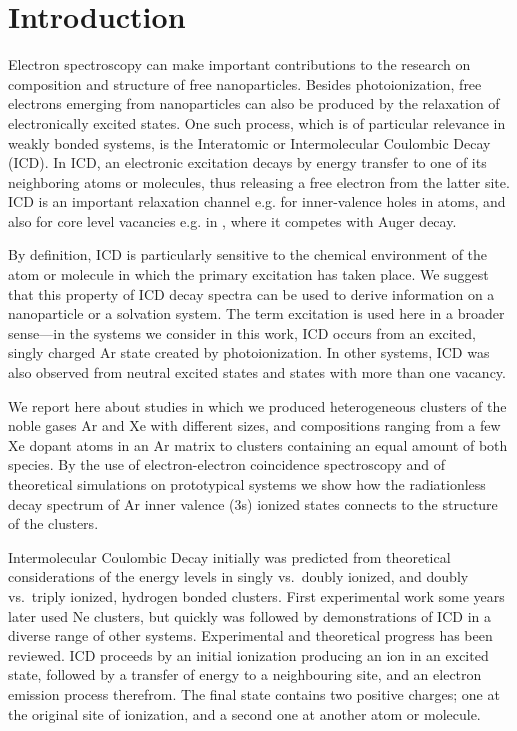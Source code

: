 \section{Introduction}
%
Electron spectroscopy can make important contributions to the 
research on composition and structure of free nanoparticles.\cite{
jpcc} Besides photoionization, free electrons emerging from 
nanoparticles can also be produced by the relaxation of 
electronically excited states. One such process, which is of 
particular relevance in weakly bonded systems, is the 
Interatomic or Intermolecular Coulombic Decay (ICD).\cite{
cederbaum} In ICD, an electronic excitation decays by energy 
transfer to one of its neighboring atoms or molecules, thus 
releasing a free electron from the latter site. ICD is an 
important relaxation channel e.g. for inner-valence holes in 
atoms, and also for core level vacancies e.g. in 
, where it competes with Auger decay.\cite{slavicek}

By definition, ICD is particularly sensitive to the chemical 
environment of the atom or molecule in which the primary 
excitation has taken place. We suggest that this property of ICD 
decay spectra can be used to derive information on a nanoparticle 
or a solvation system. 
The term excitation is used here in a broader sense---in the
systems we consider in this work, ICD occurs from an excited, singly 
charged Ar state created by photoionization.
In other systems, ICD was also observed from neutral excited
states and states with more than one vacancy.

We report here about studies 
in which we produced heterogeneous clusters of the noble gases Ar 
and Xe with different sizes, and compositions ranging from a few 
Xe dopant atoms in an Ar matrix to clusters containing an equal 
amount of both species. By the use of electron-electron 
coincidence spectroscopy and of theoretical simulations on 
prototypical systems we show how the radiationless decay spectrum 
of Ar inner valence (3s) ionized states connects to the structure 
of the clusters.

Intermolecular Coulombic Decay initially was predicted from 
theoretical considerations of the energy levels in singly vs.\  
doubly ionized, and doubly vs.\ triply ionized, hydrogen bonded 
clusters.\cite{cederbaum} First experimental work some years 
later used Ne clusters,\cite{marburger,jahnkenedimer} but quickly 
was followed by demonstrations of ICD in a diverse range of other 
systems. Experimental and theoretical progress has been reviewed.
\cite{hergenhahn_review, averbukh_review, jahnke_review} ICD 
proceeds by an initial ionization producing an ion in an excited 
state, followed by a transfer of energy to a neighbouring site, 
and an electron emission process therefrom. The final state contains 
two positive charges; one at the original site of ionization, and a second
one at another atom or molecule. 

